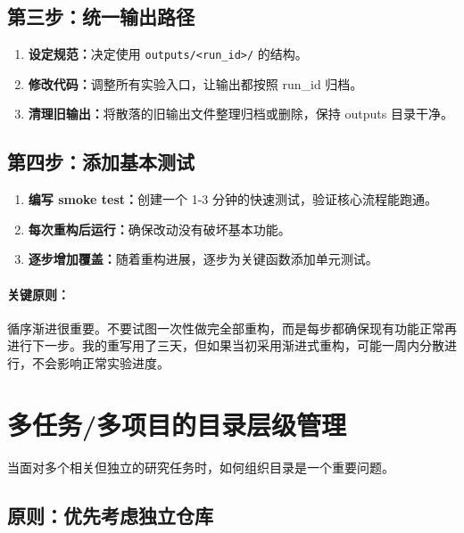 \subsection{第三步：统一输出路径}

\begin{enumerate}
  \item \textbf{设定规范：}决定使用 \texttt{outputs/<run\_id>/} 的结构。

  \item \textbf{修改代码：}调整所有实验入口，让输出都按照 run\_id 归档。

  \item \textbf{清理旧输出：}将散落的旧输出文件整理归档或删除，保持 outputs 目录干净。
\end{enumerate}

\subsection{第四步：添加基本测试}

\begin{enumerate}
  \item \textbf{编写 smoke test：}创建一个 1-3 分钟的快速测试，验证核心流程能跑通。

  \item \textbf{每次重构后运行：}确保改动没有破坏基本功能。

  \item \textbf{逐步增加覆盖：}随着重构进展，逐步为关键函数添加单元测试。
\end{enumerate}

\paragraph{关键原则：}循序渐进很重要。不要试图一次性做完全部重构，而是每步都确保现有功能正常再进行下一步。我的重写用了三天，但如果当初采用渐进式重构，可能一周内分散进行，不会影响正常实验进度。

\section{多任务/多项目的目录层级管理}

当面对多个相关但独立的研究任务时，如何组织目录是一个重要问题。

\subsection{原则：优先考虑独立仓库}

